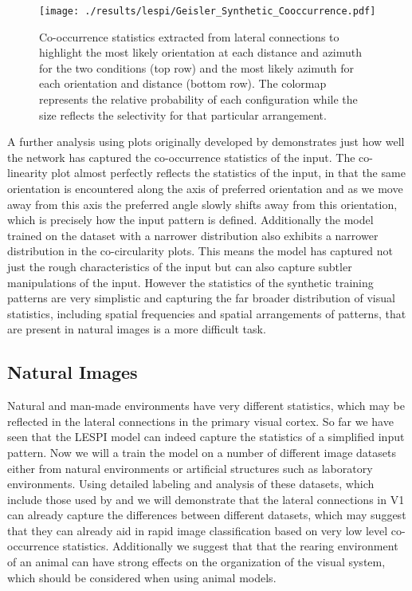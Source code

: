 \begin{figure}
	\centering
    \texttt{[image: ./results/lespi/Geisler\_Synthetic\_Cooccurrence.pdf]}
	\caption{Co-occurrence statistics extracted from lateral
      connections to highlight the most likely orientation at each
      distance and azimuth for the two conditions (top row) and the
      most likely azimuth for each orientation and distance (bottom
      row). The colormap represents the relative probability of each
      configuration while the size reflects the selectivity for that
      particular arrangement.}
	\label{SyntheticGeisler}
\end{figure}

A further analysis using plots originally developed by
\cite{Geisler2001} demonstrates just how well the network has captured
the co-occurrence statistics of the input. The co-linearity plot
almost perfectly reflects the statistics of the input, in that the
same orientation is encountered along the axis of preferred
orientation and as we move away from this axis the preferred angle
slowly shifts away from this orientation, which is precisely how the
input pattern is defined. Additionally the model trained on the
dataset with a narrower distribution also exhibits a narrower
distribution in the co-circularity plots. This means the model has
captured not just the rough characteristics of the input but can also
capture subtler manipulations of the input. However the statistics of
the synthetic training patterns are very simplistic and capturing the
far broader distribution of visual statistics, including spatial
frequencies and spatial arrangements of patterns, that are present in
natural images is a more difficult task.

\subsection{Natural Images}

Natural and man-made environments have very different statistics,
which may be reflected in the lateral connections in the primary
visual cortex. So far we have seen that the LESPI model can indeed
capture the statistics of a simplified input pattern. Now we will a
train the model on a number of different image datasets either from
natural environments or artificial structures such as laboratory
environments. Using detailed labeling and analysis of these datasets,
which include those used by \citep{Perrinet2015} and \citep{Serre2007}
we will demonstrate that the lateral connections in V1 can already
capture the differences between different datasets, which may suggest
that they can already aid in rapid image classification based on very
low level co-occurrence statistics. Additionally we suggest that that
the rearing environment of an animal can have strong effects on the
organization of the visual system, which should be considered when
using animal models.


